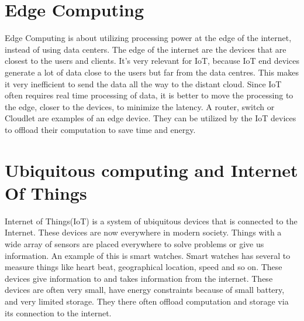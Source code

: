 











\section{Edge Computing}
Edge Computing is about utilizing processing power at the edge of the internet, instead of using data centers. The edge of the internet are the devices that are closest to the users and clients. It's very relevant for IoT, because IoT end devices generate a lot of data close to the users but far from the data centres. This makes it very inefficient to send the data all the way to the distant cloud. Since IoT often requires real time processing of data, it is better to move the processing to the edge, closer to the devices, to minimize the latency\cite{shi_edge_2016}.
A router, switch or Cloudlet are examples of an edge device. They can be utilized by the IoT devices to offload their computation to save time and energy.






\section{Ubiquitous computing and Internet Of Things}
Internet of Things(IoT) is a system of ubiquitous devices that is connected to the Internet\cite{oauthor_what_nodate}. These devices are now everywhere in modern society. Things with a wide array of sensors are placed everywhere to solve problems or give us information. An example of this is smart watches. Smart watches has several to measure things like heart beat, geographical location, speed and so on. These devices give information to and takes information from the internet. These devices are often very small, have energy constraints because of small battery, and very limited storage. They there often offload computation and storage via its connection to the internet.





